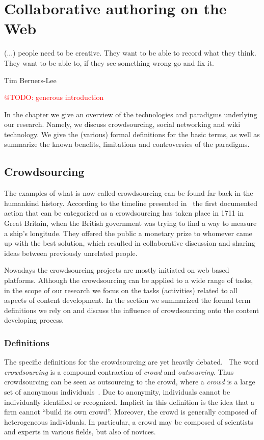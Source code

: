 \documentclass[ngerman,UKenglish,table]{scrbook}
\makeatletter
\newcommand{\todo}[1]{\textcolor{red}{@TODO: #1}}
\makeatother
\begin{document}
\chapter{Collaborative authoring on the Web}

\epigraph{(...) people need to be creative. They want to be able to record what they think. They want to be able to, if they see something wrong go and fix it.}{Tim Berners-Lee}


\todo{generous introduction}

In the chapter we give an overview of the technologies and paradigms underlying our research.
Namely, we discuss crowdsourcing, social networking and wiki technology.
We give the (various) formal definitions for the basic terms, as well as summarize the known benefits, limitations and controversies of the paradigms.

\section{Crowdsourcing}
The examples of what is now called crowdsourcing can be found far back in the humankind history.
According to the timeline presented in~\cite{dawson2012getting} the first documented action that can be categorized as a crowdsourcing has taken place in 1711 in Great Britain, when the British government was trying to find a way to measure a ship’s longitude.
They offered the public a monetary prize to whomever came up with the best solution, which resulted in collaborative discussion and sharing ideas between previously unrelated people.

Nowadays the crowdsourcing projects are mostly initiated on web-based platforms.
Although the crowdsourcing can be applied to a wide range of tasks, in the scope of our research we focus on the tasks (activities) related to all aspects of content development.
In the section we summarized the formal term definitions we rely on and discuss the influence of crowdsourcing onto the content developing process.


\subsection{Definitions}
\label{sec:crowdsourcing_def}
The specific definitions for the crowdsourcing are yet heavily debated.~\cite{estelles2012towards}
The word \emph{crowdsourcing} is a compound contraction of \emph{crowd} and \emph{outsourcing}.
Thus crowdsourcing can be seen as outsourcing to the crowd, where a \emph{crowd} is a large set of anonymous individuals~\cite{surowiecki2005wisdom}.
Due to anonymity, individuals cannot be individually identified or recognized. Implicit in this definition is the idea that a firm cannot “build its own crowd”. Moreover, the crowd is generally composed of heterogeneous individuals.
In particular, a crowd may be composed of scientists and experts in various fields, but also of novices.
\end{document}
